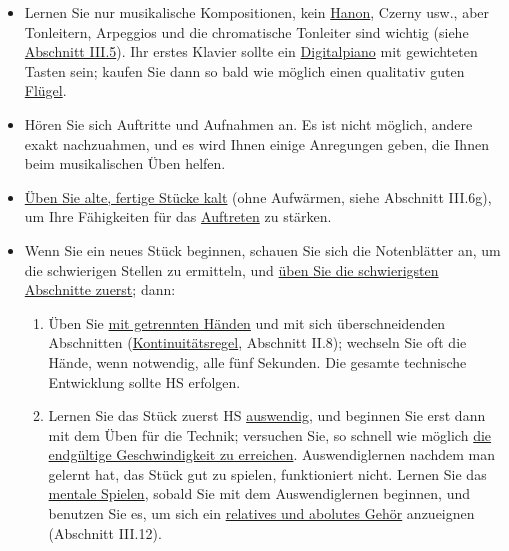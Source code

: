 \begin{itemize} 
\item Lernen Sie nur musikalische Kompositionen, kein \hyperref[c1iii7h]{Hanon}, Czerny usw., aber Tonleitern, Arpeggios und die chromatische Tonleiter sind wichtig (siehe \hyperref[c1iii5a]{Abschnitt III.5}).
Ihr erstes Klavier sollte ein \hyperref[c1iii17b]{Digitalpiano} mit gewichteten Tasten sein; kaufen Sie dann so bald wie möglich einen qualitativ guten \hyperref[c1iii17d]{Flügel}.

\item Hören Sie sich Auftritte und Aufnahmen an.
Es ist nicht möglich, andere exakt nachzuahmen, und es wird Ihnen einige Anregungen geben, die Ihnen beim musikalischen Üben helfen.

\item \hyperref[c1iii6g]{Üben Sie alte, fertige Stücke kalt} (ohne Aufwärmen, siehe Abschnitt III.6g), um Ihre Fähigkeiten für das \hyperref[c1iii14]{Auftreten} zu stärken.

\item Wenn Sie ein neues Stück beginnen, schauen Sie sich die Notenblätter an, um die schwierigen Stellen zu ermitteln, und \hyperref[c1ii5]{üben Sie die schwierigsten Abschnitte zuerst}; dann:

 \begin{enumerate}[label={\alph*.}] 
 \item Üben Sie \hyperref[c1ii7]{mit getrennten Händen} und mit sich überschneidenden Abschnitten (\hyperref[c1ii8]{Kontinuitätsregel}, Abschnitt II.8); wechseln Sie oft die Hände, wenn notwendig, alle fünf Sekunden.
Die gesamte technische Entwicklung sollte HS erfolgen.
 
 \item Lernen Sie das Stück zuerst HS \hyperref[c1iii6]{auswendig}, und beginnen Sie erst dann mit dem Üben für die Technik; versuchen Sie, so schnell wie möglich \hyperref[c1iii7i]{die endgültige Geschwindigkeit zu erreichen}.
Auswendiglernen nachdem man gelernt hat, das Stück gut zu spielen, funktioniert nicht.
Lernen Sie das \hyperref[c1ii12mental]{mentale Spielen}, sobald Sie mit dem Auswendiglernen beginnen, und benutzen Sie es, um sich ein \hyperref[c1iii12]{relatives und abolutes Gehör} anzueignen (Abschnitt III.12).
 

\end{enumerate}
\end{itemize}
